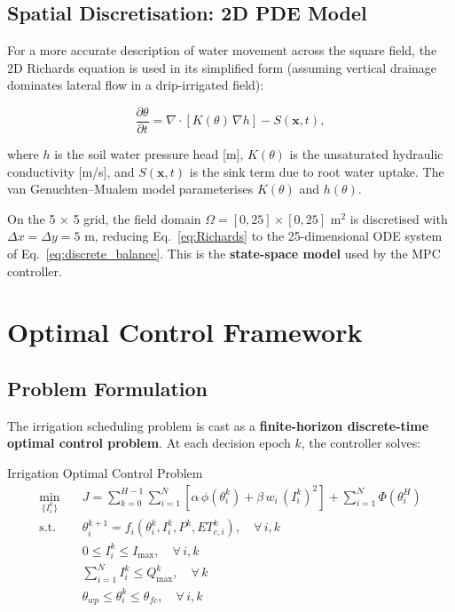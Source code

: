 \documentclass[12pt, a4paper]{report}
\begin{document}
\section{Spatial Discretisation: 2D PDE Model}

For a more accurate description of water movement across the square field, the 2D Richards equation is used in its simplified form (assuming vertical drainage dominates lateral flow in a drip-irrigated field):

\begin{equation}
  \frac{\partial \theta}{\partial t} = \nabla\cdot\!\left[K(\theta)\,\nabla h\right] - S(\mathbf{x},t),
  \label{eq:Richards}
\end{equation}

where $h$ is the soil water pressure head [m], $K(\theta)$ is the unsaturated hydraulic conductivity [m/s], and $S(\mathbf{x},t)$ is the sink term due to root water uptake. The van Genuchten–Mualem model parameterises $K(\theta)$ and $h(\theta)$.

On the 5 $\times$ 5 grid, the field domain $\Omega = [0,25]\times[0,25]$ m$^2$ is discretised with $\Delta x = \Delta y = 5$ m, reducing Eq.~\eqref{eq:Richards} to the 25-dimensional ODE system of Eq.~\eqref{eq:discrete_balance}. This is the \textbf{state-space model} used by the MPC controller.

\chapter{Optimal Control Framework}

\section{Problem Formulation}

The irrigation scheduling problem is cast as a \textbf{finite-horizon discrete-time optimal control problem}. At each decision epoch $k$, the controller solves:

\begin{mathbox}{Irrigation Optimal Control Problem}
\begin{align}
  \min_{\{I_i^k\}} \quad & J = \sum_{k=0}^{H-1}\sum_{i=1}^{N}
    \left[\alpha\,\phi\!\left(\theta_i^k\right) + \beta\,w_i\,(I_i^k)^2\right]
    + \sum_{i=1}^{N} \Phi\!\left(\theta_i^H\right)
    \label{eq:OCP}\\[4pt]
  \text{s.t.} \quad
  & \theta_i^{k+1} = f_i\!\left(\theta_i^k, I_i^k, P^k, ET_{c,i}^k\right), \quad \forall\,i,k \label{eq:dyn}\\
  & 0 \leq I_i^k \leq I_{\max}, \quad \forall\,i,k \label{eq:ctrl_bound}\\
  & \sum_{i=1}^{N} I_i^k \leq Q_{\max}^k, \quad \forall\,k \label{eq:pump_limit}\\
  & \theta_{wp} \leq \theta_i^k \leq \theta_{fc}, \quad \forall\,i,k \label{eq:state_bound}
\end{align}
\end{mathbox}
\end{document}
